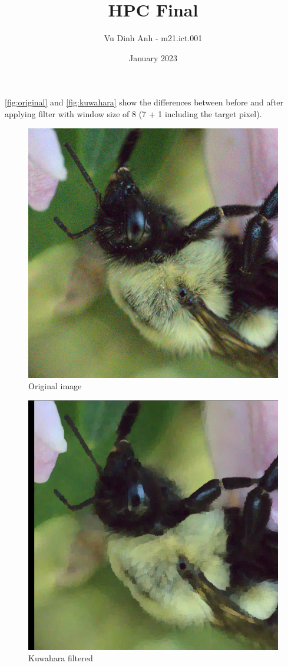 \documentclass{article}
\title{HPC Final}
\author{Vu Dinh Anh - m21.ict.001 }
\date{January 2023}
\begin{document}
\maketitle

\autoref{fig:original} and \autoref{fig:kuwahara} show the differences between before and after applying filter with window size of 8 (7 + 1 including the target pixel).

\begin{figure}[htbp]
    \centering
    \includegraphics[scale=0.2]{in.png}
    \caption{Original image}
    \label{fig:original}
\end{figure}

\begin{figure}[htbp]
    \centering
    \includegraphics[scale=0.2]{out.png}
    \caption{Kuwahara filtered}
    \label{fig:kuwahara}
\end{figure}
\end{document}
